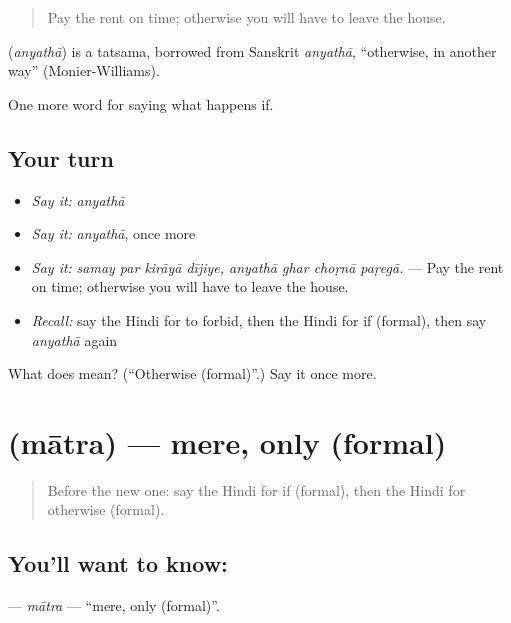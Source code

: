 \begin{quote}
Pay the rent on time; otherwise you will have to leave the house.
\end{quote}

\begin{cousinweb}
\textbf{} (\emph{anyathā}) is a tatsama, borrowed from Sanskrit \emph{anyathā}, \textquotedblleft{}otherwise, in another way\textquotedblright{} (Monier-Williams).
\end{cousinweb}

\begin{grammarlens}[title={What you've built}]
One more word for saying what happens if.
\end{grammarlens}

\subsection*{Your turn}
\begin{itemize}
\raggedright
  \item \emph{Say it:} \emph{anyathā}
  \item \emph{Say it:} \emph{anyathā}, once more
  \item \emph{Say it:} \emph{samay par kirāyā dījiye, anyathā ghar choṛnā paṛegā.} — Pay the rent on time; otherwise you will have to leave the house.
  \item \emph{Recall:} say the Hindi for to forbid, then the Hindi for if (formal), then say \emph{anyathā} again
\end{itemize}

\begin{tcolorbox}[breakable,colback=teal!4,colframe=teal!35!black,title={Before you move on}]
What does  mean? (\textquotedblleft{}Otherwise (formal)\textquotedblright{}.) Say it once more.
\end{tcolorbox}
\section[\texorpdfstring{\hi{मात्र} (mātra)}{मात्र (mātra)}]{ (mātra) — mere, only (formal)}

\label{lesson:HI-C379-matra}



\begin{quote}
Before the new one: say the Hindi for if (formal), then the Hindi for otherwise (formal).
\end{quote}

\subsection*{You'll want to know: }
\textbf{} — \emph{mātra} — \textquotedblleft{}mere, only (formal)\textquotedblright{}.

